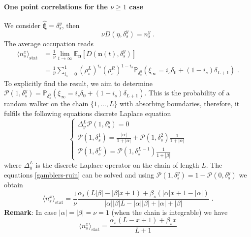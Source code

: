 \documentclass[10pt]{article}
\numberwithin{equation}{section}
\numberwithin{equation}{subsection}
\newcommand{\dt}{\;.}
\begin{document}
\paragraph{One point correlations for the $\nu\geq 1$ case}
We consider $\widehat{\bm{\xi}}=\delta_{s}^{y}$, then 
\begin{equation}
	\nu D(\eta,\delta_{s}^{y})=n_{s}^{y}\dt
\end{equation}
The average occupation reads
\begin{equation}\label{OnePtsCORR}
	\begin{split}
		\langle n_{s}^{x}\rangle_{\text{stat}}&=\frac{1}{\nu}\lim_{t\to\infty}\mathbb{E}_{\bm{n}}\left[D(\bm{n}(t),\delta_{s}^{y})\right]\\&=\frac{1}{\nu}\sum_{i_{s}=0}^{1}\left(\rho_{s}^{L}\right)^{i_{s}}\left(\rho_{s}^{R}\right)^{1-i_{s}}\mathbb{P}_{\delta_{s}^{y}}\left(\xi_{\infty}=i_{s}\delta_{0}+(1-i_{s})\delta_{L+1}\right)\dt
	\end{split}
\end{equation}
To explicitly find the result, we aim to determine $\mathcal{P}(1,\delta_{s}^{y})=\mathbb{P}_{\delta_{s}^{y}}\left(\xi_{\infty}=i_{s}\delta_{0}+(1-i_{s})\delta_{L+1}\right)$. This is the probability of a random walker on the chain $\{1,\ldots,L\}$ with absorbing boundaries, therefore, it fulfils the following equations discrete Laplace equation
\begin{equation}\label{gamblers-ruin}
	\begin{cases}
		\Delta_{y}^{L}\mathcal{P}(1,\delta_{s}^{y})=0\\
		\mathcal{P}(1,\delta_{s}^{1})=\frac{|\alpha|}{1+|\alpha|}+\mathcal{P}(1,\delta_{s}^{2})\frac{1}{1+|\alpha|}\\
		\mathcal{P}(1,\delta_{s}^{L})=\mathcal{P}(1,\delta_{s}^{L-1})\frac{1}{1+|\beta|}
	\end{cases}
\end{equation}
where $\Delta_{y}^{L}$ is the discrete Laplace operator on the chain of length $L$. The equations \eqref{gamblers-ruin} can be solved and using $\mathcal{P}(1,\delta_{s}^{y})=1-\mathcal{P}(0,\delta_{s}^{y})$ we obtain 
\begin{equation}
	\langle n_{s}^{x}\rangle_{\text{stat}}=\frac{1}{\nu}\frac{\alpha_{s}(L|\beta|-|\beta|x+1)+\beta_{s}(|\alpha|x+1-|\alpha|)}{|\alpha||\beta|L-|\alpha||\beta|+|\alpha|+|\beta|}\dt
\end{equation}
\textbf{Remark}: In case $|\alpha|=|\beta|=\nu=1$ (when the chain is integrable) we have 
\begin{equation}
	\langle n_{s}^{x}\rangle_{\text{stat}}=\frac{\alpha_{s}(L-x+1)+\beta_{s}x}{L+1}
\end{equation}
\end{document}
